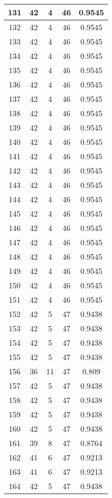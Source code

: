 \documentclass[letterpaper, 12pt]{article}
\begin{document}
\begin{longtable}{|c|c|c|c|c|}
\hline
131 & 42 & 4 & 46 & 0.9545 \\
\hline
132 & 42 & 4 & 46 & 0.9545 \\
\hline
133 & 42 & 4 & 46 & 0.9545 \\
\hline
134 & 42 & 4 & 46 & 0.9545 \\
\hline
135 & 42 & 4 & 46 & 0.9545 \\
\hline
136 & 42 & 4 & 46 & 0.9545 \\
\hline
137 & 42 & 4 & 46 & 0.9545 \\
\hline
138 & 42 & 4 & 46 & 0.9545 \\
\hline
139 & 42 & 4 & 46 & 0.9545 \\
\hline
140 & 42 & 4 & 46 & 0.9545 \\
\hline
141 & 42 & 4 & 46 & 0.9545 \\
\hline
142 & 42 & 4 & 46 & 0.9545 \\
\hline
143 & 42 & 4 & 46 & 0.9545 \\
\hline
144 & 42 & 4 & 46 & 0.9545 \\
\hline
145 & 42 & 4 & 46 & 0.9545 \\
\hline
146 & 42 & 4 & 46 & 0.9545 \\
\hline
147 & 42 & 4 & 46 & 0.9545 \\
\hline
148 & 42 & 4 & 46 & 0.9545 \\
\hline
149 & 42 & 4 & 46 & 0.9545 \\
\hline
150 & 42 & 4 & 46 & 0.9545 \\
\hline
151 & 42 & 4 & 46 & 0.9545 \\
\hline
152 & 42 & 5 & 47 & 0.9438 \\
\hline
153 & 42 & 5 & 47 & 0.9438 \\
\hline
154 & 42 & 5 & 47 & 0.9438 \\
\hline
155 & 42 & 5 & 47 & 0.9438 \\
\hline
156 & 36 & 11 & 47 & 0.809 \\
\hline
157 & 42 & 5 & 47 & 0.9438 \\
\hline
158 & 42 & 5 & 47 & 0.9438 \\
\hline
159 & 42 & 5 & 47 & 0.9438 \\
\hline
160 & 42 & 5 & 47 & 0.9438 \\
\hline
161 & 39 & 8 & 47 & 0.8764 \\
\hline
162 & 41 & 6 & 47 & 0.9213 \\
\hline
163 & 41 & 6 & 47 & 0.9213 \\
\hline
164 & 42 & 5 & 47 & 0.9438 \\

\end{longtable}
\end{document}
